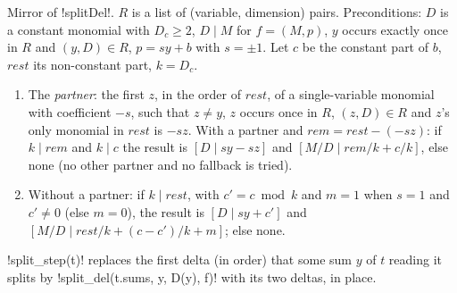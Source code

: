 {{{\begin{definition}\label{def:lean-export-sym-split}
Mirror of \lexlean!splitDel!. $R$ is a list of (variable, dimension) pairs. Preconditions: $D$ is a
constant monomial with $D_c\ge2$, $D \mid M$ for $f=(M,p)$, $y$ occurs exactly once in $R$ and
$(y, D)\in R$, $p = sy + b$ with $s=\pm1$. Let $c$ be the constant part of $b$, $\mathit{rest}$
its non-constant part, $k = D_c$.
\begin{enumerate}
\item The \emph{partner}: the first $z$, in the order of $\mathit{rest}$, of a single-variable
monomial with coefficient $-s$, such that $z\ne y$, $z$ occurs once in $R$, $(z, D)\in R$ and
$z$'s only monomial in $\mathit{rest}$ is $-s z$. With a partner and
$\mathit{rem} = \mathit{rest} - (-sz)$: if $k \mid \mathit{rem}$ and $k\mid c$ the result is
$[D \mid sy - sz]$ and $[M/D \mid \mathit{rem}/k + c/k]$, else none (no other partner and no
fallback is tried).
\item Without a partner: if $k \mid \mathit{rest}$, with $c' = c \bmod k$ and $m = 1$ when $s=1$
and $c'\ne0$ (else $m=0$), the result is $[D \mid sy + c']$ and
$[M/D \mid \mathit{rest}/k + (c-c')/k + m]$; else none.
\end{enumerate}
\end{definition}
\lexpy!split_step(t)! replaces the first delta (in order) that some sum $y$ of $t$ reading it
splits by \lexpy!split_del(t.sums, y, D(y), f)! with its two deltas, in place.

}}}
